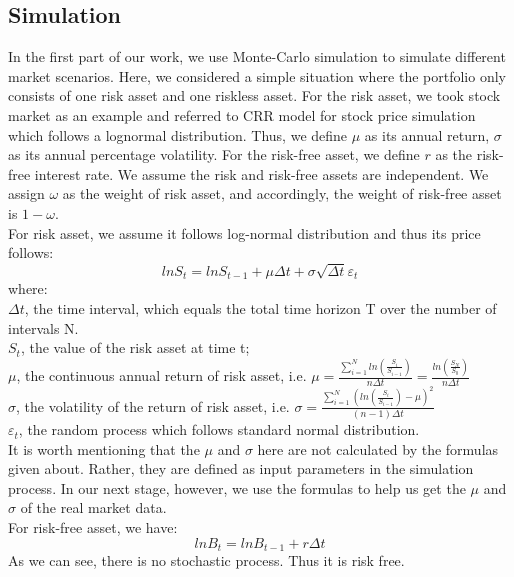 \documentclass[
10pt, %
a4paper, %
oneside, %
headinclude,footinclude, %
BCOR5mm, %
]{scrartcl}
\begin{document}
\subsection{Simulation}
In the first part of our work, we use Monte-Carlo simulation to simulate different market scenarios. Here, we considered a simple situation where the portfolio only consists of one risk asset and one riskless asset. For the risk asset, we took stock market as an example and referred to CRR model for stock price simulation which follows a lognormal distribution. Thus, we define $\mu$ as its annual return, $\sigma$ as its annual percentage volatility. For the risk-free asset, we define $r$ as the risk-free interest rate. We assume the risk and risk-free assets are independent. We assign $\omega$ as the weight of risk asset, and accordingly, the weight of risk-free asset is $1-\omega$. \\

For risk asset, we assume it follows log-normal distribution and thus its price follows:
$$lnS_{t} = lnS_{t-1} + \mu\Delta t + \sigma\sqrt{\Delta t}\varepsilon_{t} $$
where:\\

$\Delta t$, the time interval, which equals the total time horizon T over the number of intervals N.\\

$S_t$, the value of the risk asset at time t; \\

$\mu$, the continuous annual return of risk asset, i.e. $\mu = \frac{\sum_{i=1}^{N}ln(\frac{S_i}{S_{i-1}})}{n\Delta t} = \frac{ ln(\frac{S_N}{S_0}) }{n\Delta t}$ \\

$\sigma$, the volatility of the return of risk asset, i.e. $\sigma = \frac{ \sum_{i=1}^{N} ( ln(\frac{S_i}{S_{i-1}}) - \mu  )^2   }{(n-1)\Delta t}$ \\

$\varepsilon_t$, the random process which follows standard normal distribution. \\

It is worth mentioning that the $\mu$ and $\sigma$ here are not calculated by the formulas given about. Rather, they are defined as input parameters in the simulation process. In our next stage, however, we use the formulas to help us get the $\mu$ and $\sigma$ of the real market data. \\

For risk-free asset, we have:
$$ lnB_t = lnB_{t-1} + r\Delta t $$
As we can see, there is no stochastic process. Thus it is risk free. \\
\end{document}
